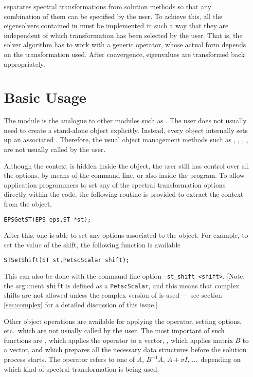 	\slepc separates spectral transformations from solution methods so that any combination of them can be specified by the user. To achieve this, all the eigensolvers contained in  must be implemented in such a way that they are independent of which transformation has been selected by the user. That is, the solver algorithm has to work with a generic operator, whose actual form depends on the transformation used. After convergence, eigenvalues are transformed back appropriately. 

\section{Basic Usage}

	The  module is the analogue to other \petsc{} modules such as . 
	The user does not usually need to create a stand-alone  object explicitly. Instead, every  object internally sets up an associated . Therefore, the usual object management methods such as , , , , are not usually called by the user.

	Although the  context is hidden inside the  object, the user still has control over all the options, by means of the command line, or also inside the program. To allow application programmers to set any of the spectral transformation options directly within the code, the following routine is provided to extract the  context from the  object,
	\begin{Verbatim}[fontsize=\small]
	EPSGetST(EPS eps,ST *st);
	\end{Verbatim}
	
	After this, one is able to set any options associated to the  object. For example, to set the value of the shift, the following function is available
	\begin{Verbatim}[fontsize=\small]
	STSetShift(ST st,PetscScalar shift);
	\end{Verbatim}
	This can also be done with the command line option \Verb!-st_shift <shift>!. [Note: the argument \texttt{shift} is defined as a \texttt{PetscScalar}, and this means that complex shifts are not allowed unless the complex version of \slepc is used --- see section \ref{sec:complex} for a detailed discussion of this issue.]

	Other object operations are available for applying the operator, setting options, etc.\ which are not usually called by the user. The most important of such functions are , which applies the operator to a vector, , which applies matrix $B$ to a vector, and  which prepares all the necessary data structures before the solution process starts. The operator refers to one of $A$, $B^{-1}\!A$, $A+\sigma I$, ...\ depending on which kind of spectral transformation is being used.
 
